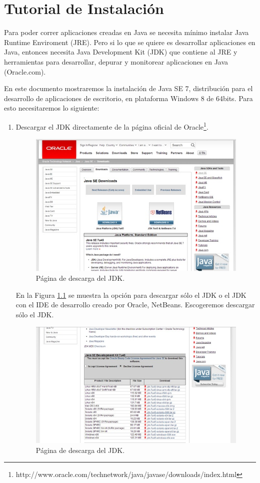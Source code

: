 \documentclass[12pt]{book} %
\begin{document}
\chapter{Tutorial de Instalación}
Para poder correr aplicaciones creadas en Java se necesita mínimo instalar Java Runtime Enviroment (JRE). Pero si lo que se quiere es desarrollar aplicaciones en Java, entonces necesita Java Development Kit (JDK) que contiene al JRE y herramientas para desarrollar, depurar y monitorear aplicaciones en Java (Oracle.com).

En este documento mostraremos la instalación  de Java SE 7, distribución para el desarrollo de aplicaciones de escritorio, en plataforma Windows 8 de 64bits. Para esto necesitaremos lo siguiente:

\begin{enumerate}

\item Descargar el JDK directamente de la página oficial de Oracle\footnote{http://www.oracle.com/technetwork/java/javase/downloads/index.html}.

\begin{figure}[!hbp]
		\centering
			\includegraphics[width=12cm]{ins1.jpg}
			\caption{Página de descarga del JDK.}
			\label{pagOracle}
		
	\end{figure}

En la Figura \ref{pagOracle} se muestra la opción para descargar sólo el JDK o el JDK con el IDE de desarrollo creado por Oracle, NetBeans. Escogeremos descargar sólo el JDK.
	
	\begin{figure}[!hbp]
		\centering
			\includegraphics[width=12cm]{ins2.jpg}
			\caption{Página de descarga del JDK.}
			\label{DescargaJDK}
	\end{figure}
	

\end{enumerate}
\end{document}
